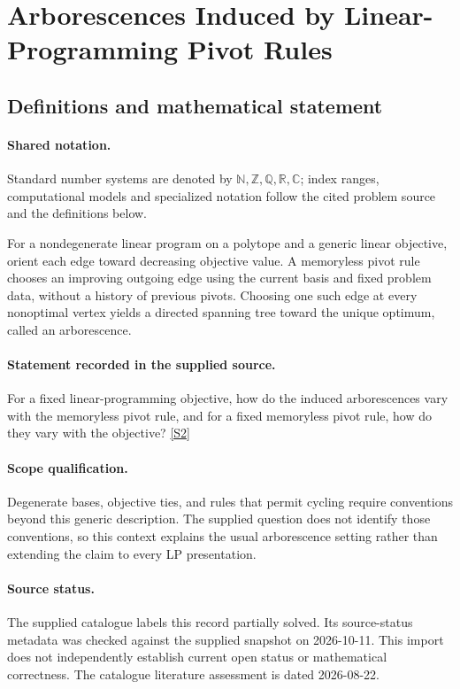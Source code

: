\documentclass[11pt]{article}
\newcommand{\sref}[2]{\hyperlink{source:#1:#2}{[S#2]}}
\begin{document}
\section{Arborescences Induced by Linear-Programming Pivot Rules}\label{statement}

\subsection{Definitions and mathematical statement}

\paragraph{Shared notation.}Standard number systems are denoted by $\mathbb N,\mathbb Z,\mathbb Q,\mathbb R,\mathbb C$; index ranges, computational models and specialized notation follow the cited problem source and the definitions below.


For a nondegenerate linear program on a polytope and a generic linear objective, orient each edge toward decreasing objective value. A memoryless pivot rule chooses an improving outgoing edge using the current basis and fixed problem data, without a history of previous pivots. Choosing one such edge at every nonoptimal vertex yields a directed spanning tree toward the unique optimum, called an arborescence.
\paragraph{Statement recorded in the supplied source.}
For a fixed linear-programming objective, how do the induced arborescences vary with the memoryless pivot rule, and for a fixed memoryless pivot rule, how do they vary with the objective? \sref{statement}{2}
\paragraph{Scope qualification.}
Degenerate bases, objective ties, and rules that permit cycling require conventions beyond this generic description. The supplied question does not identify those conventions, so this context explains the usual arborescence setting rather than extending the claim to every LP presentation.
\paragraph{Source status.}
The supplied catalogue labels this record partially solved. Its source-status metadata was checked against the supplied snapshot on 2026-10-11. This import does not independently establish current open status or mathematical correctness. The catalogue literature assessment is dated 2026-08-22.
\end{document}
